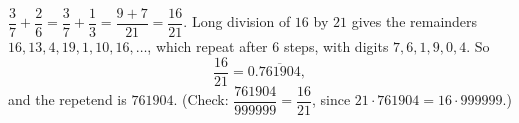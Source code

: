 $\dfrac37+\dfrac26=\dfrac37+\dfrac13=\dfrac{9+7}{21}=\dfrac{16}{21}$. Long division of $16$ by $21$ gives the remainders $16,13,4,19,1,10,16,\dots$, which repeat after $6$ steps, with digits $7,6,1,9,0,4$. So
\[\dfrac{16}{21}=0.\overline{761904},\]
and the repetend is $\boxed{761904}$. (Check: $\dfrac{761904}{999999}=\dfrac{16}{21}$, since $21\cdot761904=16\cdot999999$.)
